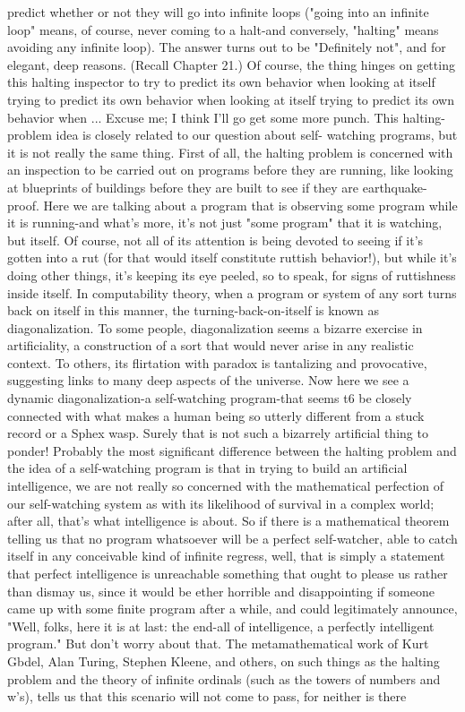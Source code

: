 predict whether or not they will go into infinite loops ("going into an infinite loop"
means, of course, never coming to a halt-and conversely, "halting" means avoiding
any infinite loop). The answer turns out to be "Definitely not", and for elegant, deep
reasons. (Recall Chapter 21.) Of course, the thing hinges on getting this halting
inspector to try to predict its own behavior when looking at itself trying to predict its
own behavior when looking at itself trying to predict its own behavior when ... Excuse
me; I think I'll go get some more punch.
         This halting-problem idea is closely related to our question about self-
watching programs, but it is not really the same thing. First of all, the halting problem
is concerned with an inspection to be carried out on programs before they are running,
like looking at blueprints of buildings before they are built to see if they are
earthquake-proof. Here we are talking about a program that is observing some
program while it is running-and what's more, it's not just "some program" that it is
watching, but itself. Of course, not all of its attention is being devoted to seeing if it's
gotten into a rut (for that would itself constitute ruttish behavior!), but while it's doing
other things, it's keeping its eye peeled, so to speak, for signs of ruttishness inside
itself.
         In computability theory, when a program or system of any sort turns back on
itself in this manner, the turning-back-on-itself is known as diagonalization. To some
people, diagonalization seems a bizarre exercise in artificiality, a construction of a
sort that would never arise in any realistic context. To others, its flirtation with
paradox is tantalizing and provocative, suggesting links to many deep aspects of the
universe. Now here we see a dynamic diagonalization-a self-watching program-that
seems t6 be closely connected with what makes a human being so utterly different
from a stuck record or a Sphex wasp. Surely that is not such a bizarrely artificial thing
to ponder!
         Probably the most significant difference between the halting problem and the
idea of a self-watching program is that in trying to build an artificial intelligence, we
are not really so concerned with the mathematical perfection of our self-watching
system as with its likelihood of survival in a complex world; after all, that's what
intelligence is about. So if there is a mathematical theorem telling us that no program
whatsoever will be a perfect self-watcher, able to catch itself in any conceivable kind
of infinite regress, well, that is simply a statement that perfect intelligence is
unreachable something that ought to please us rather than dismay us, since it would be
ether horrible and disappointing if someone came up with some finite program after a
while, and could legitimately announce, "Well, folks, here it is at last: the end-all of
intelligence, a perfectly intelligent program."
         But don't worry about that. The metamathematical work of Kurt Gbdel, Alan
Turing, Stephen Kleene, and others, on such things as the halting problem and the
theory of infinite ordinals (such as the towers of numbers and w's), tells us that this
scenario will not come to pass, for neither is there




